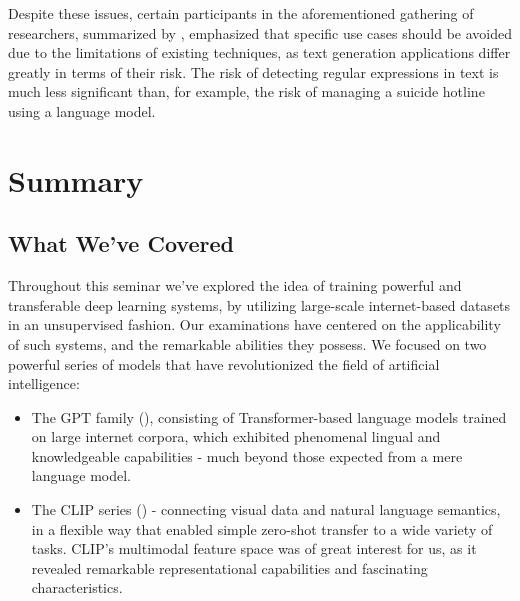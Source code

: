 \documentclass{article}
\begin{document}
\medskip
\noindent
Despite these issues, certain participants in the aforementioned gathering of researchers, summarized by \citet{tamkin2021convention}, emphasized that specific use cases should be avoided due to the limitations of existing techniques, as text generation applications differ greatly in terms of their risk. The risk of detecting regular expressions in text is much less significant than, for example, the risk of managing a suicide hotline using a language model.




\newpage
\section{Summary}
\label{chap:summary}



\subsection{What We've Covered}
\label{sec:what_was_covered}

Throughout this seminar we've explored the idea of training powerful and transferable deep learning systems, by utilizing large-scale internet-based datasets in an unsupervised fashion. Our examinations have centered on the applicability of such systems, and the remarkable abilities they possess. We focused on two powerful series of models that have revolutionized the field of artificial intelligence:
\begin{itemize}
    \item
        The GPT family (\citet{radford2018gpt1, radford2019gpt2, brown2020gpt3}), consisting of Transformer-based language models trained on large internet corpora, which exhibited phenomenal lingual and knowledgeable capabilities - much beyond those expected from a mere language model.
    \item
        The CLIP series (\citet{radford2021clip}) - connecting visual data and natural language semantics, in a flexible way that enabled simple zero-shot transfer to a wide variety of tasks. CLIP's multimodal feature space was of great interest for us, as it revealed remarkable representational capabilities and fascinating characteristics.
\end{itemize} 
\end{document}
